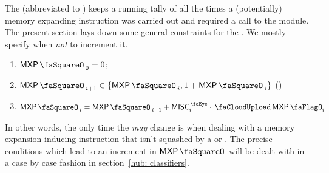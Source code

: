 The \mxpSTAMP{} (abbreviated to \mxpStamp{}) keeps a running tally of all the times a (potentially) memory expanding instruction was carried out and required a call to the \mxpMod{} module. The present section lays down some general constraints for the \mxpStamp{}. We mostly specify when \emph{not} to increment it.
\begin{enumerate}
	\item $\mxpStamp_{0} = 0$;
	\item $\mxpStamp_{i + 1} \in \{ \mxpStamp_{i}, 1 + \mxpStamp_{i} \}$ (\trash)
	\item $\mxpStamp_{i} = \mxpStamp_{i - 1} + \peekMisc_{i} \cdot \miscMxpFlag_{i}$
\end{enumerate}
In other words, the only time the \mxpStamp{} \emph{may} change is when dealing with a memory expansion inducing instruction that isn't squashed by a \suxSH{} or \soxSH{}. The precise conditions which lead to an increment in $\mxpStamp$ will be dealt with in a case by case fashion in section~\ref{hub: classifiers}.
